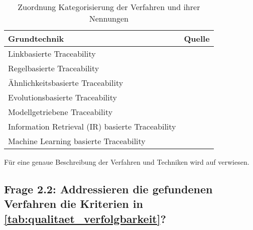 \begin{table}[htbp]
\renewcommand{\arraystretch}{1.3}
\caption{Zuordnung Kategorisierung der Verfahren und ihrer Nennungen}
\label{tab:auswertung_verfahren_kategorisierung}
\centering
\begin{threeparttable}
\begin{tabularx}{\columnwidth}{@{}Xl@{}}
\toprule
Grundtechnik & Quelle  \\ \midrule
Linkbasierte Traceability & \cite{Javed2014ACode, Spanoudakis2004Rule-basedRelations, Omoronyia2011ExploringTraceability} \\
Regelbasierte Traceability & \cite{Javed2014ACode, Ghabi2015ExploitingCode, Lago2009AManagement, Mader2012TowardsMaintenance, Mder2007CustomizingProcess, Spanoudakis2004Rule-basedRelations}  \\
Ähnlichkeitsbasierte Traceability & \cite{Tsuchiya2015InteractiveLogs, Omoronyia2011ExploringTraceability, Leuser2010TacklingSpecifications, Spanoudakis2004Rule-basedRelations} \\
Evolutionsbasierte Traceability & \cite{Javed2014ACode, Mader2012TowardsMaintenance} \\
Modellgetriebene Traceability & \cite{Javed2014ACode,Lago2009AManagement, Mader2012TowardsMaintenance, Mder2007CustomizingProcess, Mader2009EnablingRelations, Spanoudakis2004Rule-basedRelations} \\
Information Retrieval (IR) basierte Traceability & \cite{Javed2014ACode, Bavota2014EnhancingInformation, Saputri2016EnsuringApproach, Leuser2010TacklingSpecifications, Merten2016DoData}\\
Machine Learning basierte Traceability & \cite{Javed2014ACode} \\
\bottomrule
\end{tabularx}
\medskip
\end{threeparttable}
\end{table}

Für eine genaue Beschreibung der Verfahren und Techniken wird auf \cite{Javed2014ACode, Leuser2010TacklingSpecifications} verwiesen. 

\subsection{Frage 2.2: Addressieren die gefundenen Verfahren die Kriterien in \ref{tab:qualitaet_verfolgbarkeit}?}

